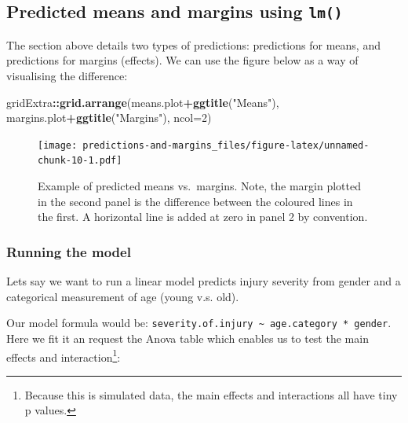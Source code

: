 \documentclass[]{article}
\newenvironment{Shaded}{\begin{snugshade}}{\end{snugshade}}
\newcommand{\DataTypeTok}[1]{\textcolor[rgb]{0.13,0.29,0.53}{#1}}
\newcommand{\DecValTok}[1]{\textcolor[rgb]{0.00,0.00,0.81}{#1}}
\newcommand{\KeywordTok}[1]{\textcolor[rgb]{0.13,0.29,0.53}{\textbf{#1}}}
\newcommand{\NormalTok}[1]{#1}
\newcommand{\OperatorTok}[1]{\textcolor[rgb]{0.81,0.36,0.00}{\textbf{#1}}}
\newcommand{\StringTok}[1]{\textcolor[rgb]{0.31,0.60,0.02}{#1}}
\let\rmarkdownfootnote\footnote%
\def\footnote{\protect\rmarkdownfootnote}
\begin{document}
\hypertarget{predicted-means-and-margins-using-lm}{%
\subsection*{\texorpdfstring{Predicted means and margins using \texttt{lm()}}{Predicted means and margins using lm()}}\label{predicted-means-and-margins-using-lm}}

The section above details two types of predictions: predictions for means, and
predictions for margins (effects). We can use the figure below as a way of
visualising the difference:

\begin{Shaded}
\begin{Highlighting}[]
\NormalTok{gridExtra}\OperatorTok{::}\KeywordTok{grid.arrange}\NormalTok{(means.plot}\OperatorTok{+}\KeywordTok{ggtitle}\NormalTok{(}\StringTok{"Means"}\NormalTok{), margins.plot}\OperatorTok{+}\KeywordTok{ggtitle}\NormalTok{(}\StringTok{"Margins"}\NormalTok{), }\DataTypeTok{ncol=}\DecValTok{2}\NormalTok{)}
\end{Highlighting}
\end{Shaded}

\begin{figure}
\centering
\texttt{[image: predictions-and-margins\_files/figure-latex/unnamed-chunk-10-1.pdf]}
\caption{\label{fig:unnamed-chunk-10}Example of predicted means vs.~margins. Note, the margin plotted in the second panel is the difference between the coloured lines in the first. A horizontal line is added at zero in panel 2 by convention.}
\end{figure}

\hypertarget{running-the-model}{%
\subsubsection*{Running the model}\label{running-the-model}}

Lets say we want to run a linear model predicts injury severity from gender and
a categorical measurement of age (young v.s. old).

Our model formula would be: \texttt{severity.of.injury\ \textasciitilde{}\ age.category\ *\ gender}. Here
we fit it an request the Anova table which enables us to test the main effects
and interaction\footnote{Because this is simulated data, the main effects and
  interactions all have tiny p values.}:
\end{document}
